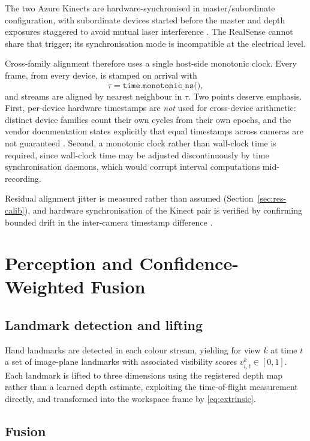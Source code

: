 The two Azure Kinects are hardware-synchronised in master/subordinate
configuration, with subordinate devices started before the master and depth
exposures staggered to avoid mutual laser interference \cite{mskinect}. The
RealSense cannot share that trigger; its synchronisation mode is incompatible
at the electrical level.

Cross-family alignment therefore uses a single host-side monotonic clock. Every
frame, from every device, is stamped on arrival with
\begin{equation}
  \tau = \texttt{time.monotonic\_ns()},
  \label{eq:hostclock}
\end{equation}
and streams are aligned by nearest neighbour in $\tau$. Two points deserve
emphasis. First, per-device hardware timestamps are \emph{not} used for
cross-device arithmetic: distinct device families count their own cycles from
their own epochs, and the vendor documentation states explicitly that equal
timestamps across cameras are not guaranteed \cite{mskinect}. Second, a
monotonic clock rather than wall-clock time is required, since wall-clock time
may be adjusted discontinuously by time synchronisation daemons, which would
corrupt interval computations mid-recording.

Residual alignment jitter is measured rather than assumed
(Section~\ref{sec:res-calib}), and hardware synchronisation of the Kinect pair
is verified by confirming bounded drift in the inter-camera timestamp
difference \cite{ridgerun}.

\section{Perception and Confidence-Weighted Fusion}
\label{sec:fusion}

\subsection{Landmark detection and lifting}

Hand landmarks are detected in each colour stream, yielding for view $k$ at
time $t$ a set of image-plane landmarks with associated visibility scores
$v^{k}_{i,t} \in [0,1]$. Each landmark is lifted to three dimensions using the
registered depth map rather than a learned depth estimate, exploiting the
time-of-flight measurement directly, and transformed into the workspace frame
by \eqref{eq:extrinsic}.

\subsection{Fusion}

